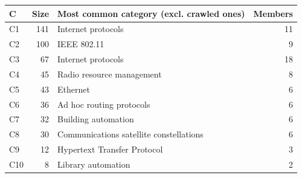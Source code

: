 
\begin{tabular}{lrlr}
\toprule
C & Size & Most common category (excl. crawled ones) & Members\\
\midrule
C1 & 141 & Internet protocols & 11\\
C2 & 100 & IEEE 802.11 & 9\\
C3 & 67 & Internet protocols & 18\\
C4 & 45 & Radio resource management & 8\\
C5 & 43 & Ethernet & 6\\
C6 & 36 & Ad hoc routing protocols & 6\\
C7 & 32 & Building automation & 6\\
C8 & 30 & Communications satellite constellations & 6\\
C9 & 12 & Hypertext Transfer Protocol & 3\\
C10 & 8 & Library automation & 2\\
\bottomrule
\end{tabular}
